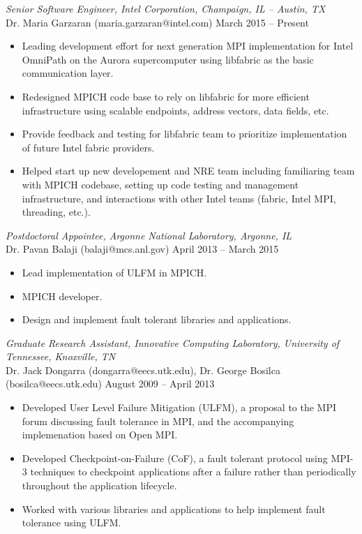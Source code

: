{\sl Senior Software Engineer, Intel Corporation, Champaign, IL -- Austin, TX} \\
Dr. Maria Garzaran (maria.garzaran@intel.com) \hfill March 2015 -- Present
\begin{itemize} \itemsep -2pt
        \item Leading development effort for next generation MPI implementation
            for Intel OmniPath on the Aurora supercomputer using libfabric as
            the basic communication layer.
        \item Redesigned MPICH code base to rely on libfabric for more efficient
            infrastructure using scalable endpoints, address vectors, data
            fields, etc.
        \item Provide feedback and testing for libfabric team to prioritize
            implementation of future Intel fabric providers.
        \item Helped start up new developement and NRE team including
            familiaring team with MPICH codebase, setting up code testing and
            management infrastructure, and interactions with other Intel teams
            (fabric, Intel MPI, threading, etc.).
\end{itemize}

{\sl Postdoctoral Appointee, Argonne National Laboratory, Argonne, IL} \\
Dr. Pavan Balaji (balaji@mcs.anl.gov) \hfill April 2013 -- March 2015
\begin{itemize} \itemsep -2pt
        \item Lead implementation of ULFM in MPICH.
        \item MPICH developer.
        \item Design and implement fault tolerant libraries and applications.
\end{itemize}

{\sl Graduate Research Assistant, Innovative Computing Laboratory, University
of Tennessee, Knoxville, TN} \\
Dr. Jack Dongarra (dongarra@eecs.utk.edu), Dr. George Bosilca
(bosilca@eecs.utk.edu) \hfill August 2009 -- April 2013 
\begin{itemize} \itemsep -2pt %
        \item Developed User Level Failure Mitigation (ULFM), a proposal to
            the MPI forum discussing fault tolerance in MPI, and the
            accompanying implemenation based on Open MPI.
        \item Developed Checkpoint-on-Failure (CoF), a fault tolerant protocol
            using MPI-3 techniques to checkpoint applications after a failure
            rather than periodically throughout the application lifecycle.
        \item Worked with various libraries and applications to help
            implement fault tolerance using ULFM.
\end{itemize}

